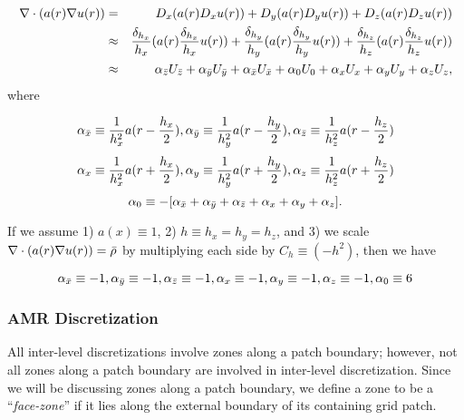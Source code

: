 \documentclass[10pt]{article}
\begin{document}
\begin{center}
\begin{minipage}{1.5in}
\end{minipage} 
\end{center}


 \begin{eqnarray*}
 \nabla\cdot(a(r) \nabla u(r)) & = & D_x (a(r) D_x u(r)) + D_y (a(r) D_y u(r)) + D_z (a(r) D_z u(r)) \\
 & \approx & \frac{\delta_{h_x}}{h_x} (a(r) \frac{\delta_{h_x}}{h_x} u(r)) + 
             \frac{\delta_{h_y}}{h_y} (a(r) \frac{\delta_{h_y}}{h_y} u(r)) + 
             \frac{\delta_{h_z}}{h_z} (a(r) \frac{\delta_{h_z}}{h_z} u(r)) \\
 & \approx & \alpha_{\bar{z}}U_{\bar{z}} +  \alpha_{\bar{y}}U_{\bar{y}} +  \alpha_{\bar{x}}U_{\bar{x}} 
  +  \alpha_{0}U_{0} 
  +  \alpha_{x}U_{x} +  \alpha_{y}U_{y} +  \alpha_{z}U_{z},
 \end{eqnarray*}
where

\[\alpha_{\bar{x}}  \equiv  \frac{1}{h_x^2} a(r-\frac{h_x}{2}),
 \alpha_{\bar{y}}  \equiv  \frac{1}{h_y^2} a(r-\frac{h_y}{2}), 
 \alpha_{\bar{z}}  \equiv  \frac{1}{h_z^2} a(r-\frac{h_z}{2}) \]
 \[\alpha_{x}  \equiv  \frac{1}{h_x^2} a(r+\frac{h_x}{2}), 
 \alpha_{y}  \equiv  \frac{1}{h_y^2} a(r+\frac{h_y}{2}),
 \alpha_{z}  \equiv  \frac{1}{h_z^2} a(r+\frac{h_z}{2}) \]
 \[\alpha_{0}   \equiv  - [\alpha_{\bar{x}} + \alpha_{\bar{y}} + \alpha_{\bar{z}} + \alpha_{x} + \alpha_{y} + \alpha_{z}]. \]

If we assume 1) $a(x)\equiv 1$, 2) $h\equiv h_x = h_y = h_z$, and 3)
we scale $\nabla\cdot(a(r) \nabla u(r)) = \bar{\rho}$ by multiplying
each side by $C_h \equiv (-h^2)$, then we have

\[\alpha_{\bar{x}}  \equiv  -1,
 \alpha_{\bar{y}}  \equiv  -1,
 \alpha_{\bar{z}}  \equiv  -1,
 \alpha_{x}  \equiv  -1,
 \alpha_{y}  \equiv  -1,
 \alpha_{z}  \equiv  -1,
 \alpha_{0}   \equiv  6 \]

\subsubsection{AMR Discretization} \label{sss:discret-amr}

All inter-level discretizations involve zones along a patch boundary;
however, not all zones along a patch boundary are involved in
inter-level discretization.  Since we will be discussing zones along a
patch boundary, we define a zone to be a ``\textit{face-zone}'' if it
lies along the external boundary of its containing grid patch.

\begin{center}
\begin{minipage}{4in}
\end{minipage}
\end{center}
\end{document}
